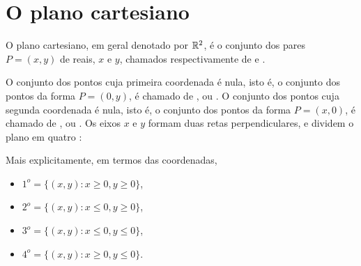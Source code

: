 \section{O plano cartesiano}
O plano cartesiano, em geral denotado por $\mathbb{R}^2$, é o conjunto dos pares $P=(x,y)$ de
reais,
$x$ e $y$, chamados respectivamente de  e . 

\begin{center}
\begin{bmlimage}\end{bmlimage}
\end{center}

O conjunto dos pontos cuja primeira coordenada é nula, isto é, o conjunto dos pontos da
forma $P=(0,y)$, é chamado de , ou . 
O conjunto dos pontos cuja segunda coordenada é nula, isto é, o conjunto dos pontos da
forma $P=(x,0)$, é chamado de , ou .
Os eixos $x$ e $y$ formam duas retas perpendiculares, e dividem o plano em quatro
:
\begin{center}
\begin{bmlimage}\end{bmlimage}
\end{center}
Mais explicitamente, em termos das coordenadas, 
\begin{multicols}{2}
\begin{itemize}
\item $1^o=\{(x,y):x\geq 0, y\geq 0\}$,
\item $2^o=\{(x,y):x\leq 0, y\geq 0\}$,
\item $3^o=\{(x,y):x\leq 0, y\leq 0\}$,
\item $4^o=\{(x,y):x\geq 0, y\leq 0\}$.
\end{itemize}
\end{multicols}

